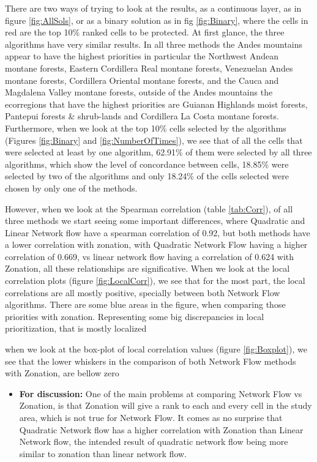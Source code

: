 \documentclass[]{article}
\providecommand{\tightlist}{%
  \setlength{\itemsep}{0pt}\setlength{\parskip}{0pt}}
\begin{document}
There are two ways of trying to look at the results, as a continuous layer, as in figure \ref{fig:AllSols}, or as a binary solution as in fig \ref{fig:Binary}, where the cells in red are the top 10\% ranked cells to be protected. At first glance, the three algorithms have very similar results. In all three methods the Andes mountains appear to have the highest priorities in particular the Northwest Andean montane forests, Eastern Cordillera Real montane forests, Venezuelan Andes montane forests, Cordillera Oriental montane forests, and the Cauca and Magdalena Valley montane forests, outside of the Andes mountains the ecorregions that have the highest priorities are Guianan Highlands moist forests, Pantepui forests \& shrub-lands and Cordillera La Costa montane forests. Furthermore, when we look at the top 10\% cells selected by the algorithms (Figures \ref{fig:Binary} and \ref{fig:NumberOfTimes}), we see that of all the cells that were selected at least by one algorithm, 62.91\% of them were selected by all three algorithms, which show the level of concordance between cells, 18.85\% were selected by two of the algorithms and only 18.24\% of the cells selected were chosen by only one of the methods.

However, when we look at the Spearman correlation (table \ref{tab:Corr}), of all three methods we start seeing some important differences, where Quadratic and Linear Network flow have a spearman correlation of 0.92, but both methods have a lower correlation with zonation, with Quadratic Network Flow having a higher correlation of 0.669, vs linear network flow having a correlation of 0.624 with Zonation, all these relationships are significative. When we look at the local correlation plots (figure \ref{fig:LocalCorr}), we see that for the most part, the local correlations are all mostly positive, specially between both Network Flow algorithms. There are some blue areas in the figure, when comparing those priorities with zonation. Representing some big discrepancies in local prioritization, that is mostly localized

when we look at the box-plot of local correlation values (figure \ref{fig:Boxplot}), we see that the lower whiskers in the comparison of both Network Flow methods with Zonation, are bellow zero

\begin{itemize}
\tightlist
\item
  \textbf{For discussion:} One of the main problems at comparing Network Flow vs Zonation, is that Zonation will give a rank to each and every cell in the study area, which is not true for Network Flow. It comes as no surprise that Quadratic Network flow has a higher correlation with Zonation than Linear Network flow, the intended result of quadratic network flow being more similar to zonation than linear network flow.
\end{itemize}
\end{document}
